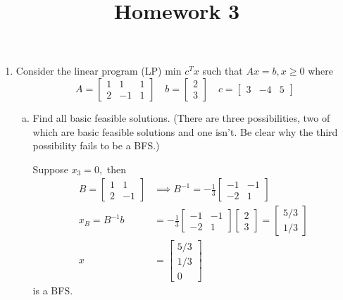 \documentclass{article}
\begin{document}
\title{Homework 3}
\maketitle
\thispagestyle{fancy}

\begin{enumerate}
	\item Consider the linear program (LP) min $c^T x$ such that $Ax=b, x\ge0$ where \[A=\begin{bmatrix}
				1 & 1 & 1 \\
				2 & -1 & 1
			\end{bmatrix}\quad b=\begin{bmatrix}
				2 \\ 3
			\end{bmatrix}\quad c=\begin{bmatrix}
				3 & -4 & 5
		\end{bmatrix}\]

		\begin{enumerate}[a)]
			\item Find all basic feasible solutions. (There are three possibilities, two of which are basic feasible solutions and one isn't. Be clear why the third possibility fails to be a BFS.)
				\begin{soln}
					Suppose $x_3=0,$ then 
					\begin{align*}
						B=\begin{bmatrix}
							1 & 1 \\
							2 & -1
						\end{bmatrix}&\implies B^{-1} = -\frac{1}{3}\begin{bmatrix}
							-1 & -1 \\
							-2 & 1
					\end{bmatrix} \\
						x_B = B^{-1}b&=-\frac{1}{3}\begin{bmatrix}
							-1 & -1 \\
							-2 & 1
						\end{bmatrix}\begin{bmatrix}
							2 \\ 3
						\end{bmatrix} = \begin{bmatrix}
							5/3 \\ 1/3
					\end{bmatrix} \\
						x&=\begin{bmatrix}
							5/3 \\ 1/3 \\ 0
					\end{bmatrix}
					\end{align*} is a BFS.


\end{soln}
\end{enumerate}
\end{enumerate}
\end{document}
